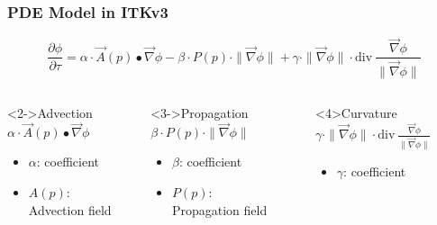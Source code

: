 \documentclass[18pt]{beamer}
\begin{document}
\begin{frame}
\frametitle{PDE Model in ITKv3}
\begin{equation*}
 \frac{\partial \phi}{\partial \tau} = 
      \alpha \cdot \overrightarrow{A}(p) \bullet \overrightarrow{\nabla} \phi -
      \beta \cdot P(p) \cdot \|\overrightarrow{\nabla} \phi\| +
      \gamma \cdot \|\overrightarrow{\nabla} \phi\| \cdot 
      \text{div}\ \frac{\overrightarrow{\nabla}
      \phi}{\|\overrightarrow{\nabla} \phi\|}    
\end{equation*}

\begin{columns}
  \begin{block}<2->{Advection}
    $\alpha \cdot \overrightarrow{A}(p) \bullet \overrightarrow{\nabla} \phi$
    \begin{itemize}
     \item $\alpha$: coefficient
     \item $A(p)$:\\ Advection field
    \end{itemize}

  \end{block}

  \begin{block}<3->{Propagation}
    $\beta \cdot P(p) \cdot \|\overrightarrow{\nabla} \phi\|$
    \begin{itemize}
      \item $\beta$: coefficient
      \item $P(p)$:\\ Propagation field
    \end{itemize}

  \end{block}

  \begin{block}<4>{Curvature}
    $\gamma \cdot \|\overrightarrow{\nabla} \phi\| \cdot 
      \text{div}\ \frac{\overrightarrow{\nabla}
      \phi}{\|\overrightarrow{\nabla} \phi\|}$
    \begin{itemize}
     \item $\gamma$: coefficient
    \end{itemize}
    \vspace{0.8cm}
  \end{block}
\end{columns}

\end{frame}
\end{document}
